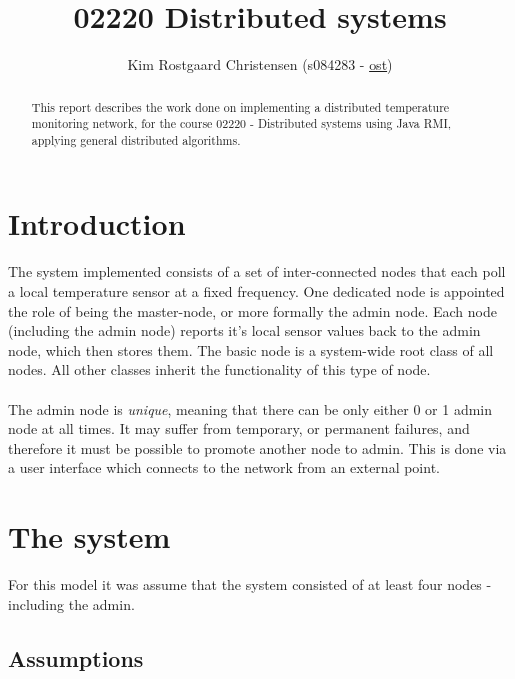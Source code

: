 \documentclass[10pt,a4paper]{article}
\begin{document}
\def\File#1{\textsf{#1}}
\def\Code#1{\texttt{#1}}
\def\Key#1{\textsf{#1}}

\title{02220 Distributed systems}
\author{Kim Rostgaard Christensen (s084283 - \href{mailto:kroch@imm.dtu.dk}{ost})}

\maketitle

\tableofcontents

\begin{abstract}
This report describes the work done on implementing a distributed temperature monitoring network, for the course 02220 - Distributed systems using Java RMI, applying general distributed algorithms.
\end{abstract}

\section{Introduction}
The system implemented consists of a set of inter-connected nodes that each poll a local temperature sensor at a fixed frequency. One dedicated node is appointed the role of being the master-node, or more formally the admin node. Each node (including the admin node) reports it's local sensor values back to the admin node, which then stores them.
The basic node is a system-wide root class of all nodes. All other classes inherit the functionality of this type of node.\\\\
The admin node is \emph{unique}, meaning that there can be only either 0 or 1 admin node at all times. It may suffer from temporary, or permanent failures, and therefore it must be possible to promote another node to admin. This is done via a user interface which connects to the network from an external point.

\section{The system}

For this model it was assume that the system consisted of at least four nodes - including the admin.

\subsection{Assumptions}
\end{document}
